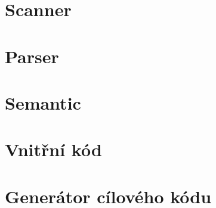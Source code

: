 \documentclass[12pt]{article}
\begin{document}

\section{Scanner}


\section{Parser}


\section{Semantic}


\section{Vnitřní kód}


\section{Generátor cílového kódu}

\end{document}
